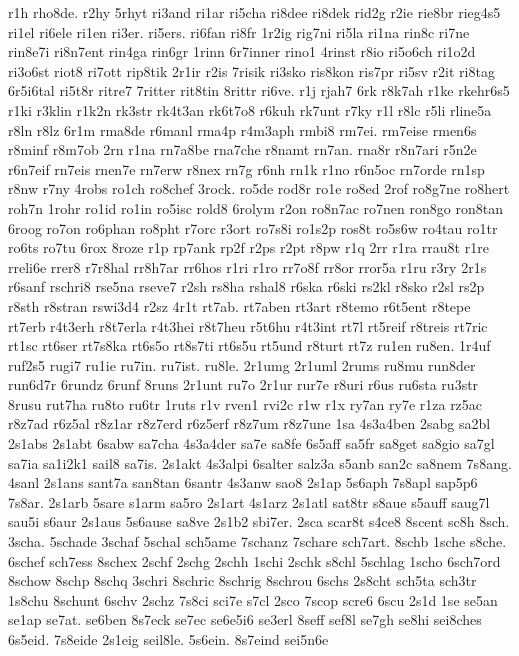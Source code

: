 {r1h
rho8de.
r2hy
5rhyt
ri3and
ri1ar
ri5cha
ri8dee
ri8dek
rid2g
r2ie
rie8br
rieg4s5
ri1el
ri6ele
ri1en
ri3er.
ri5ers.
ri6fan
ri8fr
1r2ig
rig7ni
ri5la
ri1na
rin8c
ri7ne
rin8e7i
ri8n7ent
rin4ga
rin6gr
1rinn
6r7inner
rino1
4rinst
r8io
ri5o6ch
ri1o2d
ri3o6st
riot8
ri7ott
rip8tik
2r1ir
r2is
7risik
ri3sko
ris8kon
ris7pr
ri5sv
r2it
ri8tag
6r5i6tal
ri5t8r
ritre7
7ritter
rit8tin
8rittr
ri6ve.
r1j
rjah7
6rk
r8k7ah
r1ke
rkehr6s5
r1ki
r3klin
r1k2n
rk3str
rk4t3an
rk6t7o8
r6kuh
rk7unt
r7ky
r1l
r8lc
r5li
rline5a
r8ln
r8lz
6r1m
rma8de
r6manl
rma4p
r4m3aph
rmbi8
rm7ei.
rm7eise
rmen6s
r8minf
r8m7ob
2rn
r1na
rn7a8be
rna7che
r8namt
rn7an.
rna8r
r8n7ari
r5n2e
r6n7eif
rn7eis
rnen7e
rn7erw
r8nex
rn7g
r6nh
rn1k
r1no
r6n5oc
rn7orde
rn1sp
r8nw
r7ny
4robs
ro1ch
ro8chef
3rock.
ro5de
rod8r
ro1e
ro8ed
2rof
ro8g7ne
ro8hert
roh7n
1rohr
ro1id
ro1in
ro5isc
rold8
6rolym
r2on
ro8n7ac
ro7nen
ron8go
ron8tan
6roog
ro7on
ro6phan
ro8pht
r7orc
r3ort
ro7s8i
ro1s2p
ros8t
ro5s6w
ro4tau
ro1tr
ro6ts
ro7tu
6rox
8roze
r1p
rp7ank
rp2f
r2ps
r2pt
r8pw
r1q
2rr
r1ra
rrau8t
r1re
rreli6e
rrer8
r7r8hal
rr8h7ar
rr6hos
r1ri
r1ro
rr7o8f
rr8or
rror5a
r1ru
r3ry
2r1s
r6sanf
rschri8
rse5na
rseve7
r2sh
rs8ha
rshal8
r6ska
r6ski
rs2kl
r8sko
r2sl
rs2p
r8sth
r8stran
rswi3d4
r2sz
4r1t
rt7ab.
rt7aben
rt3art
r8temo
r6t5ent
r8tepe
rt7erb
r4t3erh
r8t7erla
r4t3hei
r8t7heu
r5t6hu
r4t3int
rt7l
rt5reif
r8treis
rt7ric
rt1sc
rt6ser
rt7s8ka
rt6s5o
rt8s7ti
rt6s5u
rt5und
r8turt
rt7z
ru1en
ru8en.
1r4uf
ruf2s5
rugi7
ru1ie
ru7in.
ru7ist.
ru8le.
2r1umg
2r1uml
2rums
ru8mu
run8der
run6d7r
6rundz
6runf
8runs
2r1unt
ru7o
2r1ur
rur7e
r8uri
r6us
ru6sta
ru3str
8rusu
rut7ha
ru8to
ru6tr
1ruts
r1v
rven1
rvi2c
r1w
r1x
ry7an
ry7e
r1za
rz5ac
r8z7ad
r6z5al
r8z1ar
r8z7erd
r6z5erf
r8z7um
r8z7une
1sa
4s3a4ben
2sabg
sa2bl
2s1abs
2s1abt
6sabw
sa7cha
4s3a4der
sa7e
sa8fe
6s5aff
sa5fr
sa8get
sa8gio
sa7gl
sa7ia
sa1i2k1
sail8
sa7is.
2s1akt
4s3alpi
6salter
salz3a
s5anb
san2c
sa8nem
7s8ang.
4sanl
2s1ans
sant7a
san8tan
6santr
4s3anw
sao8
2s1ap
5s6aph
7s8apl
sap5p6
7s8ar.
2s1arb
5sare
s1arm
sa5ro
2s1art
4s1arz
2s1atl
sat8tr
s8aue
s5auff
saug7l
sau5i
s6aur
2s1aus
5s6ause
sa8ve
2s1b2
sbi7er.
2sca
scar8t
s4ce8
8scent
sc8h
8sch.
3scha.
5schade
3schaf
5schal
sch5ame
7schanz
7schare
sch7art.
8schb
1sche
s8che.
6schef
sch7ess
8schex
2schf
2schg
2schh
1schi
2schk
s8chl
5schlag
1scho
6sch7ord
8schow
8schp
8schq
3schri
8schric
8schrig
8schrou
6schs
2s8cht
sch5ta
sch3tr
1s8chu
8schunt
6schv
2schz
7s8ci
sci7e
s7cl
2sco
7scop
scre6
6scu
2s1d
1se
se5an
se1ap
se7at.
se6ben
8s7eck
se7ec
se6e5i6
se3erl
8seff
sef8l
se7gh
se8hi
sei8ches
6s5eid.
7s8eide
2s1eig
seil8le.
5s6ein.
8s7eind
sei5n6e
}
